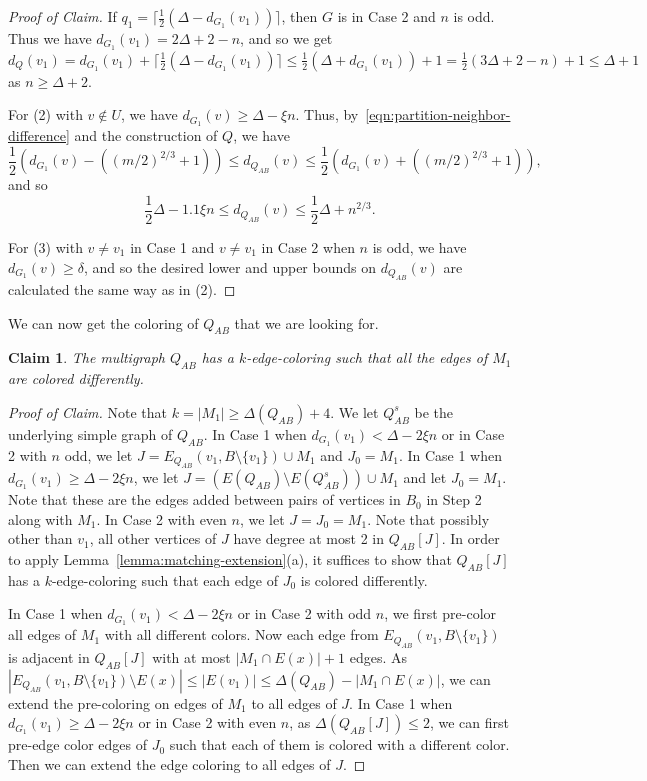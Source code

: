 \documentclass[11pt, oneside]{article}
\newtheorem{claim}{Claim}
\newenvironment{proofc}{\begin{proof}[Proof of Claim]}{\end{proof}}
\begin{document}
\begin{proofc}
If $q_1= \lceil \frac{1}{2}(\Delta -d_{G_1}(v_1)) \rceil$, then 
   $G$ is in Case 2 and $n$ is odd.   Thus we have $d_{G_1}(v_1) =2\Delta+2-n$, and so 
 we get $d_Q(v_1) =d_{G_1}(v_1)+\lceil \frac{1}{2}(\Delta -d_{G_1}(v_1)) \rceil   \le  \frac{1}{2}(\Delta+d_{G_1}(v_1))+1  =\frac{1}{2}(3\Delta+2-n)+1 \le \Delta+1$ as
 $n\ge \Delta+2$. 
  
For (2) with $v\not\in U$, we  have $d_{G_1}(v) \ge \Delta-\xi n$. Thus, 
  by~\eqref{eqn:partition-neighbor-difference} and the construction of $Q$, we have 
$$
 \frac{1}{2}\left (d_{G_1}(v)- ((m/2)^{2/3}+1) \right) \le d_{Q_{AB}}(v) \le \frac{1}{2}\left(d_{G_1}(v)+ ((m/2)^{2/3}+1)\right),  
$$
and so 
$$
\frac{1}{2} \Delta -1.1 \xi n  \le d_{Q_{AB}}(v) \le \frac{1}{2} \Delta +n^{2/3}. 
$$

For (3) with $v\ne v_1$ in Case 1 and $v\ne v_1$ in Case 2 when $n$ is odd, we have $d_{G_1}(v) \ge \delta$, 
and so  the desired lower and upper bounds on $d_{Q_{AB}}(v)$ are calculated the same way as in (2).  
\end{proofc}

We can now get the coloring of $Q_{AB}$ that we are looking for.


\begin{claim} \label{claim:existence-k-coloring}
    The multigraph $Q_{AB}$ has a $k$-edge-coloring such that all the edges of $M_1$ are colored differently. 
\end{claim}

\begin{proofc} Note that $k= |M_1| \ge \Delta(Q_{AB})+4$. 
 We let $Q^s_{AB}$ be the underlying simple graph of 
$Q_{AB}$.
In Case 1 when $d_{G_1}(v_1)< \Delta-2\xi n$ or in Case 2 with $n$ odd,  we let $J=E_{Q_{AB}}(v_1, B\setminus \{v_1\}) \cup M_1$ and $J_0 =M_1$.  
In Case 1 when $d_{G_1}(v_1) \ge  \Delta-2\xi n$, we let $J=(E(Q_{AB}) \setminus E(Q^s_{AB}) )\cup M_1$ and let $J_0 = M_1$. Note that these are the edges added between pairs of vertices in $B_0$ in Step 2 along with $M_1$. In Case 2 with even $n$, we let $J=J_0 =M_1$.  Note that possibly other than $v_1$, all  other vertices of $J$ have degree at most 2 in $Q_{AB}[J]$. 
In order to apply Lemma~\ref{lemma:matching-extension}(a), it suffices to show that 
$Q_{AB}[J]$ has a $k$-edge-coloring such that each edge of $J_0$ is colored differently.  


In Case 1 when $d_{G_1}(v_1)< \Delta-2\xi n$ or in Case 2 with odd $n$, 
we first pre-color all edges  of $M_1$ with all different colors. 
Now each edge from $E_{Q_{AB}}(v_1, B\setminus \{v_1\})$ is adjacent in $Q_{AB}[J]$ 
with at most $|M_1\cap E(x)| +1$ edges. 
As $|E_{Q_{AB}}(v_1, B\setminus \{v_1\}) \setminus E(x)| \le |E(v_1)|\le \Delta(Q_{AB}) -|M_1\cap E(x)|$, we can extend the pre-coloring on edges of $M_1$ to all edges of $J$. 
In Case 1 when $d_{G_1}(v_1) \ge  \Delta-2\xi n$ or in Case 2 with even $n$, as $ \Delta(Q_{AB}[J]) \le 2$, we can first pre-edge color edges of $J_0$ such that each of them is colored with a   different color. Then we can extend the edge coloring to all edges of $J$. 
\end{proofc}
\end{document}

